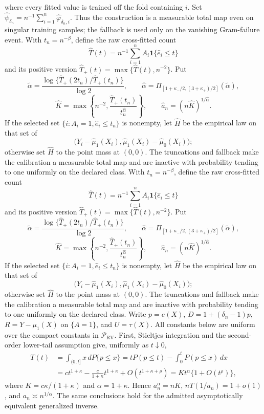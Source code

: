 where every fitted value is trained off the fold containing \(i\).  Set \(\widehat\psi_{\delta_n}=n^{-1}\sum_{i=1}^n\widehat\varphi_{\delta_n,i}\).  Thus the construction is a measurable total map even on singular training samples; the fallback is used only on the vanishing Gram-failure event.
With \(t_n=n^{-\beta}\), define the raw cross-fitted count
\[
 \widehat T(t)=n^{-1}\sum_{i=1}^n A_i\mathbf 1\{\widehat e_i\leq t\}
\]
and its positive version \(\widehat T_+(t)=\max\{\widehat T(t),n^{-2}\}\).  Put
\[
 \widetilde\alpha=\frac{\log\{\widehat T_+(2t_n)/\widehat T_+(t_n)\}}{\log2},\qquad
 \widehat\alpha=\Pi_{[1+\kappa_-/2,(3+\kappa_+)/2]}(\widetilde\alpha),
\]
\[
 \widehat K=\max\!\left\{n^{-2},\frac{\widehat T_+(t_n)}{t_n^{\widehat\alpha}}\right\},
 \qquad \widehat a_n=(n\widehat K)^{1/\widehat\alpha}.
\]
If the selected set \(\{i:A_i=1,\widehat e_i\leq t_n\}\) is nonempty, let \(\widehat H\) be the empirical law on that set of
\[
 \bigl(Y_i-\widehat\mu_1(X_i),\widehat\mu_1(X_i)-\widehat\mu_0(X_i)\bigr);
\]
otherwise set \(\widehat H\) to the point mass at \((0,0)\).  The truncations and fallback make the calibration a measurable total map and are inactive with probability tending to one uniformly on the declared class.
With \(t_n=n^{-\beta}\), define the raw cross-fitted count
\[
 \widehat T(t)=n^{-1}\sum_{i=1}^n A_i\mathbf 1\{\widehat e_i\leq t\}
\]
and its positive version \(\widehat T_+(t)=\max\{\widehat T(t),n^{-2}\}\).  Put
\[
 \widetilde\alpha=\frac{\log\{\widehat T_+(2t_n)/\widehat T_+(t_n)\}}{\log2},\qquad
 \widehat\alpha=\Pi_{[1+\kappa_-/2,(3+\kappa_+)/2]}(\widetilde\alpha),
\]
\[
 \widehat K=\max\!\left\{n^{-2},\frac{\widehat T_+(t_n)}{t_n^{\widehat\alpha}}\right\},
 \qquad \widehat a_n=(n\widehat K)^{1/\widehat\alpha}.
\]
If the selected set \(\{i:A_i=1,\widehat e_i\leq t_n\}\) is nonempty, let \(\widehat H\) be the empirical law on that set of
\[
 \bigl(Y_i-\widehat\mu_1(X_i),\widehat\mu_1(X_i)-\widehat\mu_0(X_i)\bigr);
\]
otherwise set \(\widehat H\) to the point mass at \((0,0)\).  The truncations and fallback make the calibration a measurable total map and are inactive with probability tending to one uniformly on the declared class.
Write \(p=e(X)\), \(D=1+(\delta_n-1)p\), \(R=Y-\mu_1(X)\) on \(\{A=1\}\), and \(U=\tau(X)\).  All constants below are uniform over the compact constants in \(\mathcal P_{\mathrm{RV}}\).  First, Stieltjes integration and the second-order lower-tail assumption give, uniformly as \(t\downarrow0\),
\[
\begin{split}
 T(t)
 &=\int_{(0,t]}x\,dP\{p\leq x\}
 =tP(p\leq t)-\int_0^tP(p\leq x)\,dx\\
 &=c t^{1+\kappa}-\frac{c}{1+\kappa}t^{1+\kappa}
   +O(t^{1+\kappa+\rho})
 =K t^\alpha\{1+O(t^\rho)\},
\end{split}
\]
where \(K=c\kappa/(1+\kappa)\) and \(\alpha=1+\kappa\).  Hence \(a_n^\alpha=nK\), \(nT(1/a_n)=1+o(1)\), and \(a_n\asymp n^{1/\alpha}\).  The same conclusions hold for the admitted asymptotically equivalent generalized inverse.

